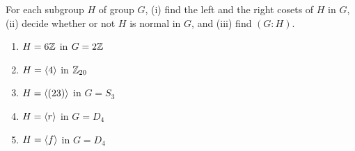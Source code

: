 \begin{exercise} For each subgroup $H$ of group $G$, (i) find the left and the right cosets of $H$ in $G$, (ii) decide whether or not $H$ is normal in $G$, and (iii) find $(G:H)$.

\medskip
{}

\begin{enumerate}
\item $H=6\mathbb{Z}$ in $G=2\mathbb{Z}$
\item $H=\langle4\rangle$ in $\mathbb{Z}_{20}$
\item $H=\langle(23)\rangle$ in $G=S_3$
\item $H=\langle r\rangle$ in $G=D_4$
\item $H=\langle f\rangle$ in $G=D_4$
\end{enumerate}

\end{exercise}


